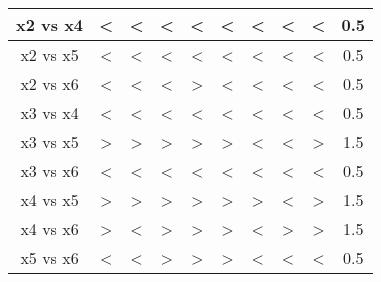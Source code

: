\documentclass[a4paper,14pt]{extreport}
\begin{document}
\begin{table}[h]
\begin{center}
\begin{tabular}{|c|ccccccc|c|c|}
x2 vs x4          & \multicolumn{1}{c|}{<} & \multicolumn{1}{c|}{<} & \multicolumn{1}{c|}{<} & \multicolumn{1}{c|}{<} & \multicolumn{1}{c|}{<} & \multicolumn{1}{c|}{<} & < & <                                  & 0.5                               \\ \hline
x2 vs x5          & \multicolumn{1}{c|}{<} & \multicolumn{1}{c|}{<} & \multicolumn{1}{c|}{<} & \multicolumn{1}{c|}{<} & \multicolumn{1}{c|}{<} & \multicolumn{1}{c|}{<} & < & <                                  & 0.5                               \\ \hline
x2 vs x6          & \multicolumn{1}{c|}{<} & \multicolumn{1}{c|}{<} & \multicolumn{1}{c|}{<} & \multicolumn{1}{c|}{>} & \multicolumn{1}{c|}{<} & \multicolumn{1}{c|}{<} & < & <                                  & 0.5                               \\ \hline
x3 vs x4          & \multicolumn{1}{c|}{<} & \multicolumn{1}{c|}{<} & \multicolumn{1}{c|}{<} & \multicolumn{1}{c|}{<} & \multicolumn{1}{c|}{<} & \multicolumn{1}{c|}{<} & < & <                                  & 0.5                               \\ \hline
x3 vs x5          & \multicolumn{1}{c|}{>} & \multicolumn{1}{c|}{>} & \multicolumn{1}{c|}{>} & \multicolumn{1}{c|}{>} & \multicolumn{1}{c|}{>} & \multicolumn{1}{c|}{<} & < & >                                  & 1.5                               \\ \hline
x3 vs x6          & \multicolumn{1}{c|}{<} & \multicolumn{1}{c|}{<} & \multicolumn{1}{c|}{<} & \multicolumn{1}{c|}{<} & \multicolumn{1}{c|}{<} & \multicolumn{1}{c|}{<} & < & <                                  & 0.5                               \\ \hline
x4 vs x5          & \multicolumn{1}{c|}{>} & \multicolumn{1}{c|}{>} & \multicolumn{1}{c|}{>} & \multicolumn{1}{c|}{>} & \multicolumn{1}{c|}{>} & \multicolumn{1}{c|}{>} & < & >                                  & 1.5                               \\ \hline
x4 vs x6          & \multicolumn{1}{c|}{>} & \multicolumn{1}{c|}{<} & \multicolumn{1}{c|}{>} & \multicolumn{1}{c|}{>} & \multicolumn{1}{c|}{>} & \multicolumn{1}{c|}{<} & > & >                                  & 1.5                               \\ \hline
x5 vs x6          & \multicolumn{1}{c|}{<} & \multicolumn{1}{c|}{<} & \multicolumn{1}{c|}{>} & \multicolumn{1}{c|}{>} & \multicolumn{1}{c|}{>} & \multicolumn{1}{c|}{<} & < & <                                  & 0.5                               \\ \hline
\end{tabular}
\end{center} 
\end{table}
\end{document}

